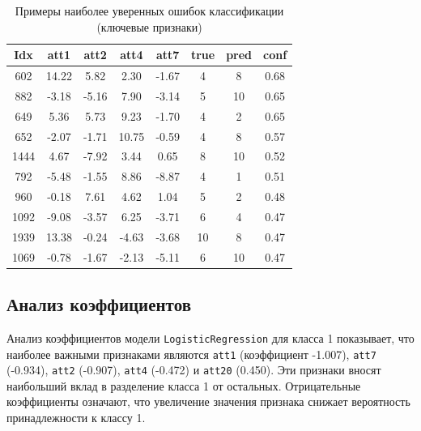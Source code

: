 \documentclass[oneside,a4paper,14pt]{extarticle}
\begin{document}
\begin{table}[ht]
\centering
\begin{tabular}{cccccccc}
\toprule
Idx & att1 & att2 & att4 & att7 & true & pred & conf \\
\midrule
602 & 14.22 & 5.82 & 2.30 & -1.67 & 4 & 8 & 0.68 \\
882 & -3.18 & -5.16 & 7.90 & -3.14 & 5 & 10 & 0.65 \\
649 & 5.36 & 5.73 & 9.23 & -1.70 & 4 & 2 & 0.65 \\
652 & -2.07 & -1.71 & 10.75 & -0.59 & 4 & 8 & 0.57 \\
1444 & 4.67 & -7.92 & 3.44 & 0.65 & 8 & 10 & 0.52 \\
792 & -5.48 & -1.55 & 8.86 & -8.87 & 4 & 1 & 0.51 \\
960 & -0.18 & 7.61 & 4.62 & 1.04 & 5 & 2 & 0.48 \\
1092 & -9.08 & -3.57 & 6.25 & -3.71 & 6 & 4 & 0.47 \\
1939 & 13.38 & -0.24 & -4.63 & -3.68 & 10 & 8 & 0.47 \\
1069 & -0.78 & -1.67 & -2.13 & -5.11 & 6 & 10 & 0.47 \\
\bottomrule
\end{tabular}
\caption{Примеры наиболее уверенных ошибок классификации (ключевые признаки)}

\end{table}

\subsection{Анализ коэффициентов}
Анализ коэффициентов модели \texttt{LogisticRegression} для класса 1 показывает, что наиболее важными признаками являются \texttt{att1} (коэффициент -1.007), \texttt{att7} (-0.934), \texttt{att2} (-0.907), \texttt{att4} (-0.472) и \texttt{att20} (0.450). Эти признаки вносят наибольший вклад в разделение класса 1 от остальных. Отрицательные коэффициенты означают, что увеличение значения признака снижает вероятность принадлежности к классу 1.
\end{document}
